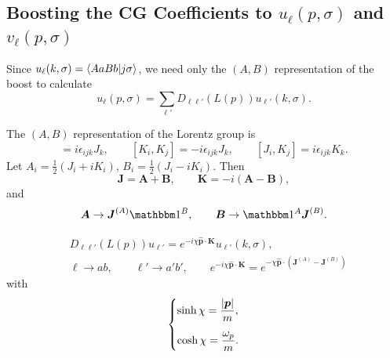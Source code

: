 \subsection{\texorpdfstring{Boosting the CG Coefficients to $u_\ell(p, \sigma)$ and $v_\ell(p, \sigma)$}{Boosting the CG Coefficients to u(p,sigma) and v(p,sigma)}}
Since $u_\ell(k, \sigma) = \braket{A a B b | j \sigma}$, we need only the $(A, B)$ representation of the boost to calculate
\begin{equation}
    u_\ell(p, \sigma) = \sum_{\ell'} D_{\ell \ell'} (L(p)) u_{\ell'} (k, \sigma).
\end{equation}
\begin{framed}
    The $(A, B)$ representation of the Lorentz group is
    \begin{equation}
        [J_i, J_j] = i \epsilon_{i j k} J_k, \qquad [K_i, K_j] = - i \epsilon_{i j k} J_k, \qquad [J_i, K_j] = i \epsilon_{i j k} K_k.
    \end{equation}
    Let $A_i = \frac{1}{2} (J_i + i K_i)$, $B_i = \frac{1}{2} (J_i - i K_i)$. Then
    \begin{equation}
        \boldsymbol{J} = \boldsymbol{A} + \boldsymbol{B}, \qquad \boldsymbol{K} = - i (\boldsymbol{A} - \boldsymbol{B}),
    \end{equation}
    and
    \begin{equation}
        \boldsymbol{A} \to \boldsymbol{J}^{(A)} \id^B, \qquad \boldsymbol{B} \to \id^A \boldsymbol{J}^{(B)}.
    \end{equation}
\end{framed}
\begin{align}
    & D_{\ell \ell'} (L(p)) u_{\ell'} = e^{ - i \chi \hat{\boldsymbol{p}} \cdot \boldsymbol{K}} u_{\ell'} (k, \sigma), \\
    & \ell \to a b, \qquad \ell' \to a' b', \qquad e^{ - i \chi \hat{\boldsymbol{p}} \cdot \boldsymbol{K}} = e^{ - \chi \hat{\boldsymbol{p}} \cdot (\boldsymbol{J}^{(A)} - \boldsymbol{J}^{(B)})}
\end{align}
with
\begin{equation}
    \begin{dcases}
        \sinh \chi = \frac{|\boldsymbol{p} |}{m}, \\[2mm]
        \cosh \chi = \frac{\omega_p}{m}.
    \end{dcases}
\end{equation}
